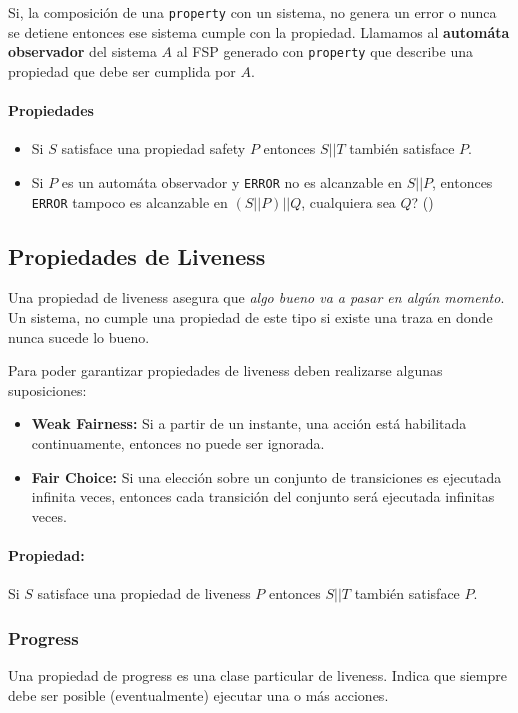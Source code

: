 Si, la composición de una \texttt{property} con un sistema, no genera un error o nunca se detiene entonces ese sistema cumple con la propiedad. Llamamos al \textbf{automáta observador} del sistema $A$ al FSP generado con \texttt{property} que describe una propiedad que debe ser cumplida por $A$.

\paragraph{Propiedades}
\begin{itemize}
\item Si $S$ satisface una propiedad safety $P$ entonces $S||T$ también satisface $P$.
\item Si $P$ es un automáta observador y \texttt{ERROR} no es alcanzable en $S||P$, entonces \texttt{ERROR} tampoco es alcanzable en $(S||P)||Q$, cualquiera sea $Q$? ()

\end{itemize}

\subsection{Propiedades de Liveness}
Una propiedad de liveness asegura que \textit{algo bueno va a pasar en algún momento}. Un sistema, no cumple una propiedad de este tipo si existe una traza en donde nunca sucede lo bueno.

Para poder garantizar propiedades de liveness deben realizarse algunas suposiciones:

\begin{itemize}
\item \textbf{Weak Fairness:} Si a partir de un instante, una acción está habilitada continuamente, entonces no puede ser ignorada.
\item \textbf{Fair Choice:} Si una elección sobre un conjunto de transiciones es ejecutada infinita veces, entonces cada transición del conjunto será ejecutada infinitas veces.
\end{itemize}

\paragraph{Propiedad:} Si $S$ satisface una propiedad de liveness $P$ entonces $S||T$ también satisface $P$.

\subsubsection{Progress}
Una propiedad de progress es una clase particular de liveness. Indica que siempre debe ser posible (eventualmente) ejecutar una o más acciones.

